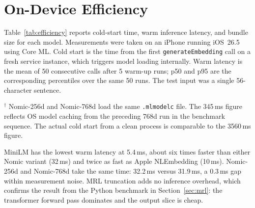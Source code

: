 \section{On-Device Efficiency}
\label{sec:efficiency}

Table~\ref{tab:efficiency} reports cold-start time, warm inference latency, and bundle size for each model. Measurements were taken on an iPhone running iOS~26.5 using Core ML. Cold start is the time from the first \texttt{generateEmbedding} call on a fresh service instance, which triggers model loading internally. Warm latency is the mean of 50 consecutive calls after 5 warm-up runs; p50 and p95 are the corresponding percentiles over the same 50 runs. The test input was a single 56-character sentence.

\begin{table}[h]
\centering
\caption{On-device efficiency (iPhone, iOS 26.5, Core ML, Neural Processing Unit)}
\label{tab:efficiency}

\smallskip
{\footnotesize $^\dagger$ Nomic-256d and Nomic-768d load the same \texttt{.mlmodelc} file. The 345\,ms figure reflects OS model caching from the preceding 768d run in the benchmark sequence. The actual cold start from a clean process is comparable to the 3560\,ms figure.}
\end{table}

MiniLM has the lowest warm latency at 5.4\,ms, about six times faster than either Nomic variant (32\,ms) and twice as fast as Apple NLEmbedding (10\,ms). Nomic-256d and Nomic-768d take the same time: 32.2\,ms versus 31.9\,ms, a 0.3\,ms gap within measurement noise. MRL truncation adds no inference overhead, which confirms the result from the Python benchmark in Section~\ref{sec:mrl}: the transformer forward pass dominates and the output slice is cheap.

